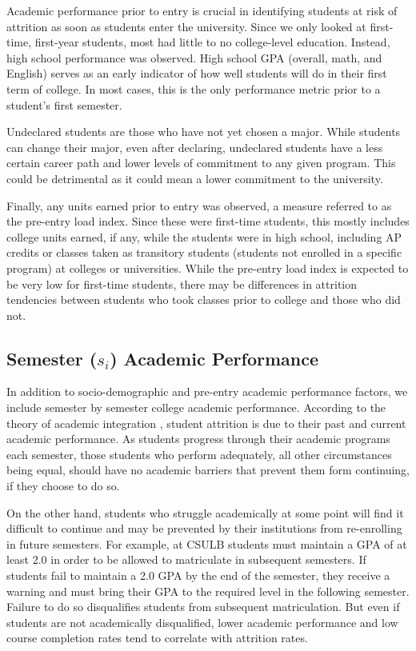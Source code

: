 \documentclass[notitlepage,12pt]{jedm}
\begin{document}
\par Academic performance prior to entry is crucial in identifying students at risk of attrition as soon as students enter the university. Since we only looked at first-time, first-year students, most had little to no college-level education. Instead, high school performance was observed. High school GPA (overall, math, and English) serves as an early indicator of how well students will do in their first term of college. In most cases, this is the only performance metric prior to a student's first semester.

\par Undeclared students are those who have not yet chosen a major. While students can change their major, even after declaring, undeclared students have a less certain career path and lower levels of commitment to any given program. This could be detrimental as it could mean a lower commitment to the university.

\par Finally, any units earned prior to entry was observed, a measure referred to as the pre-entry load index. Since these were first-time students, this mostly includes college units earned, if any, while the students were in high school, including AP credits or classes taken as transitory students (students not enrolled in a specific program) at colleges or universities. While the pre-entry load index is expected to be very low for first-time students, there may be differences in attrition tendencies between students who took classes prior to college and those who did not.

\subsection{Semester ($s_i$) Academic Performance}

\par In addition to socio-demographic and pre-entry academic performance factors, we include semester by semester college academic performance. According to the theory of academic integration \cite{tinto2006research}, student attrition is due to their past and current academic performance. As students progress through their academic programs each semester, those students who perform adequately, all other circumstances being equal, should have no academic barriers that prevent them form continuing, if they choose to do so. 

\par On the other hand, students who struggle academically at some point will find it difficult to continue and may be prevented by their institutions from re-enrolling in future semesters. For example, at CSULB students must maintain a GPA of at least 2.0 in order to be allowed to matriculate in subsequent semesters. If students fail to maintain a 2.0 GPA by the end of the semester, they receive a warning and must bring their GPA to the required level in the following semester. Failure to do so disqualifies students from subsequent matriculation. But even if students are not academically disqualified, lower academic performance and low course completion rates tend to correlate with attrition rates.
\end{document}
